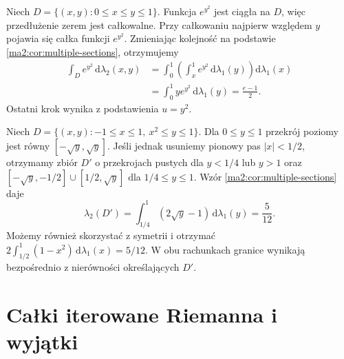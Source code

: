 \begin{przyklad}
\label{ma2:ex:multiple-order-gauss}
Niech $D=\{(x,y):0\le x\le y\le1\}$.
Funkcja $e^{y^2}$ jest ciągła na $D$, więc
przedłużenie zerem jest całkowalne.
Przy całkowaniu najpierw względem $y$ pojawia się
całka funkcji $e^{y^2}$. Zmieniając kolejność
na podstawie \ref{ma2:cor:multiple-sections},
otrzymujemy
\[
 \begin{aligned}
 \int_D e^{y^2}\,\mathrm d\lambda_2(x,y)
 &=\int_0^1\left(\int_x^1e^{y^2}\,
       \mathrm d\lambda_1(y)\right)\mathrm d\lambda_1(x)\\
 &=\int_0^1 ye^{y^2}\,\mathrm d\lambda_1(y)
 =\frac{e-1}{2}.
 \end{aligned}
\]
Ostatni krok wynika z podstawienia $u=y^2$.
\end{przyklad}

\begin{przyklad}
\label{ma2:ex:multiple-order-split}
Niech $D=\{(x,y):-1\le x\le1,\ x^2\le y\le1\}$.
Dla $0\le y\le1$ przekrój poziomy jest równy
$[-\sqrt y,\sqrt y]$. Jeśli jednak usuniemy
pionowy pas $|x|<1/2$, otrzymamy zbiór $D'$
o przekrojach pustych dla $y<1/4$ lub $y>1$ oraz
$[-\sqrt y,-1/2]\cup[1/2,\sqrt y]$ dla $1/4\le y\le1$.
Wzór \ref{ma2:cor:multiple-sections} daje
\[
 \lambda_2(D')=\int_{1/4}^1(2\sqrt y-1)\,
 \mathrm d\lambda_1(y)=\frac5{12}.
\]
Możemy również skorzystać z symetrii i otrzymać
$2\int_{1/2}^1(1-x^2)\,\mathrm d\lambda_1(x)=5/12$.
W obu rachunkach granice wynikają bezpośrednio
z nierówności określających $D'$.
\end{przyklad}

\section{Całki iterowane Riemanna i wyjątki}

